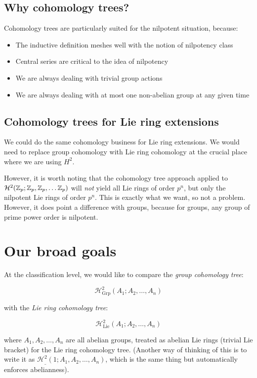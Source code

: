\documentclass[10pt]{amsart}
\begin{document}
\subsection{Why cohomology trees?}

Cohomology trees are particularly suited for the nilpotent situation, because:

\begin{itemize}
\item The inductive definition meshes well with the notion of nilpotency class
\item Central series are critical to the idea of nilpotency
\item We are always dealing with trivial group actions
\item We are always dealing with at most one non-abelian group at any given time
\end{itemize}

\subsection{Cohomology trees for Lie ring extensions}

We could do the same cohomology business for Lie ring extensions. We
would need to replace group cohomology with Lie ring cohomology at the
crucial place where we are using $H^2$.

However, it is worth noting that the cohomology tree approach applied
to $\mathcal{H}^2(\mathbb{Z}_p;\mathbb{Z}_p,\mathbb{Z}_p,\dots\mathbb{Z}_p)$ will {\em not} yield all
Lie rings of order $p^n$, but only the nilpotent Lie rings of order
$p^n$. This is exactly what we want, so not a problem. However, it
does point a difference with groups, because for groups, any group of
prime power order is nilpotent.

\section{Our broad goals}

At the classification level, we would like to compare the {\em group cohomology tree}:

$$\mathcal{H}^2_{\operatorname{Grp}}(A_1;A_2,\dots,A_n)$$

with the {\em Lie ring cohomology tree}:

$$\mathcal{H}^2_{\operatorname{Lie}}(A_1;A_2,\dots,A_n)$$

where $A_1,A_2,\dots,A_n$ are all abelian groups, treated as abelian
Lie rings (trivial Lie bracket) for the Lie ring cohomology
tree. (Another way of thinking of this is to write it as
$\mathcal{H}^2_{\_}(1;A_1,A_2,\dots,A_n)$, which is the same thing but
automatically enforces abelianness).
\end{document}
